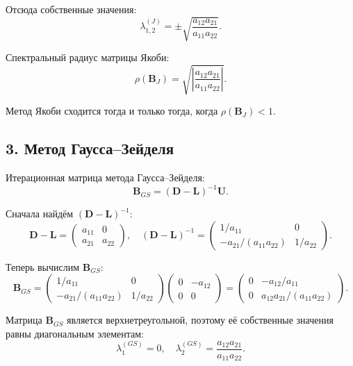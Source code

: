 \documentclass{article}
\begin{document}
Отсюда собственные значения:
\begin{equation}
\lambda_{1,2}^{(J)} = \pm \sqrt{\frac{a_{12} a_{21}}{a_{11} a_{22}}}.
\end{equation}

Спектральный радиус матрицы Якоби:
\begin{equation}
\rho(\mathbf{B}_J) = \sqrt{\left|\frac{a_{12} a_{21}}{a_{11} a_{22}}\right|}.
\label{eq:rho_j}
\end{equation}

Метод Якоби сходится тогда и только тогда, когда $\rho(\mathbf{B}_J) < 1$.

\subsection*{3. Метод Гаусса--Зейделя}

Итерационная матрица метода Гаусса--Зейделя:
\begin{equation}
\mathbf{B}_{GS} = (\mathbf{D} - \mathbf{L})^{-1} \mathbf{U}.
\end{equation}

Сначала найдём $(\mathbf{D} - \mathbf{L})^{-1}$:
\begin{equation}
\mathbf{D} - \mathbf{L} =
\begin{pmatrix}
a_{11} & 0 \\
a_{21} & a_{22}
\end{pmatrix}, \quad
(\mathbf{D} - \mathbf{L})^{-1} =
\begin{pmatrix}
1/a_{11} & 0 \\
-a_{21}/(a_{11} a_{22}) & 1/a_{22}
\end{pmatrix}.
\end{equation}

Теперь вычислим $\mathbf{B}_{GS}$:
\begin{equation}
\mathbf{B}_{GS} =
\begin{pmatrix}
1/a_{11} & 0 \\
-a_{21}/(a_{11} a_{22}) & 1/a_{22}
\end{pmatrix}
\begin{pmatrix}
0 & -a_{12} \\
0 & 0
\end{pmatrix}
=
\begin{pmatrix}
0 & -a_{12}/a_{11} \\
0 & a_{12} a_{21}/(a_{11} a_{22})
\end{pmatrix}.
\end{equation}

Матрица $\mathbf{B}_{GS}$ является верхнетреугольной, поэтому её собственные значения равны диагональным элементам:
\begin{equation}
\lambda_1^{(GS)} = 0, \quad \lambda_2^{(GS)} = \frac{a_{12} a_{21}}{a_{11} a_{22}}.
\end{equation}
\end{document}
